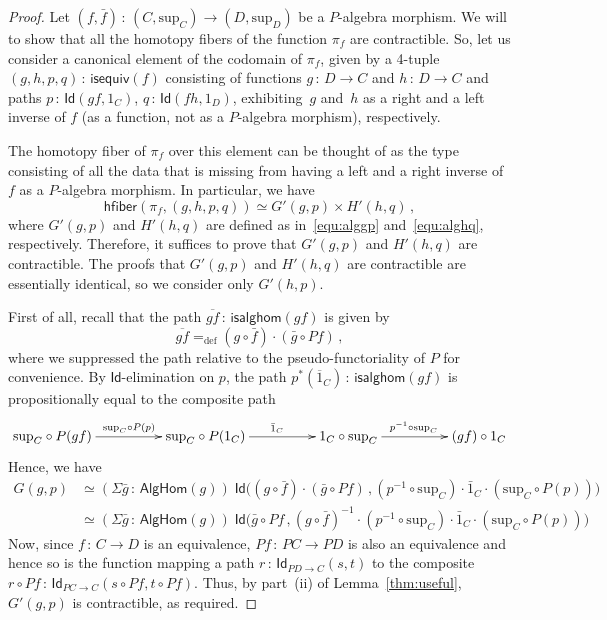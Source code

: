 \documentclass[10pt,a4paper,oneside,reqno]{amsart}
\numberwithin{equation}{section}
\theoremstyle{mythm}
\theoremstyle{mydef}
\theoremstyle{myrmk}
\newcommand{\defeq}{=_{\mathrm{def}}}
\newcommand{\co}{\,{:}\,}
\newcommand{\ct}{\cdot}
\newcommand{\hfiber}{\mathsf{hfiber}}
\newcommand{\Id}{\mathsf{Id}}
\renewcommand{\sup}{\mathrm{sup}}
\begin{document}
\begin{proof} Let $(f, \bar{f}) \co (C, \sup_C) \to (D, \sup_D)$ be a  $P$-algebra morphism. We will to
show that all the homotopy fibers of the function $\pi_f$ are contractible.
So, let us consider a canonical element of the codomain of $\pi_f$,  given by a 4-tuple $( g, h, p, q) \co \mathsf{isequiv}(f)$ consisting of functions $g \co D \to C$ and $h \co D \to C$ and paths $p \co \Id(gf, 1_C)$, $q \co \Id(fh, 1_D)$,
exhibiting~$g$ and~$h$ as a right and a left inverse of $f$ (as a function, not as a $P$-algebra morphism), respectively. 

The homotopy fiber of $\pi_f$ over this element can be thought of as the type consisting of all
the data that is missing from having a left and a right inverse of $f$ as a $P$-algebra morphism. 
In particular, we have
\begin{equation*}
\hfiber(\pi_f, (g, h, p, q ) ) \simeq G'(g,p) \times H'(h,q) \, ,
\end{equation*}
where $G'(g,p)$ and $H'(h,q)$ are defined as in~\eqref{equ:alggp} and~\eqref{equ:alghq}, respectively.
Therefore, it suffices to prove that $G'(g,p)$ and $H'(h,q)$ are  contractible.  The proofs that $G'(g,p)$ and $H'(h,q)$ are contractible are essentially identical, so we consider only $G'(h,p)$.

First of all,  recall that the path $\overline{gf} \co  \mathsf{isalghom}(gf) $ is given by 
\[
\overline{gf} \defeq (g \circ \bar{f}) \ct (\bar{g} \circ Pf ) \, ,
\]
where we suppressed the path relative to the pseudo-functoriality of $P$ for convenience. 
By $\Id$-elimination on $p$, the path $p^*(\overline{1}_C) \co \mathsf{isalghom}(gf)$ is propositionally equal to the composite path
\[
\xymatrix@C=1.7cm{
\sup_C \circ P(gf) \ar[r]^{\sup_C \circ P(p)} & \sup_C \circ P(1_C) \ar[r]^{\bar{1}_C} & 1_C \circ \sup_C \ar[r]^{p^{-1} \circ \sup_C} & 
(g f) \circ 1_C }
\]
Hence, we have 
\begin{align*} 
G(g,p)  & \simeq  (\Sigma \bar{g} \co  \mathsf{AlgHom}(g))  \; 
\Id \big( (g \circ \bar{f}) \ct (\bar{g} \circ Pf ) \, , 
  (p^{-1} \circ \sup_C) \ct \bar{1}_C \ct (\sup_C \circ P(p)) \big) \\
& \simeq 
(\Sigma \bar{g} \co  \mathsf{AlgHom}(g))  \; 
\Id \big( \bar{g} \circ Pf  \, , (g \circ \bar{f})^{-1} \ct 
  (p^{-1} \circ \sup_C) \ct \bar{1}_C \ct (\sup_C \circ P(p)) \big)
\end{align*} 
Now, since $f \co C \to D$ is an equivalence, $Pf \co PC \to PD$ is also an equivalence and hence so
is the function mapping a path $r \co \Id_{PD \to C}(s,t)$ to the composite $r \circ Pf \co \Id_{PC \to C}( s \circ Pf, t \circ Pf)$. Thus, by part~(ii) of Lemma~\ref{thm:useful}, $G'(g,p)$ is contractible, as required.
\end{proof} 
\end{document}
